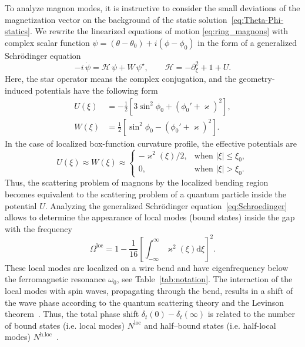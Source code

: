 To analyze magnon modes, it is instructive to consider the small deviations of the magnetization vector on the background of the static solution~\eqref{eq:Theta-Phi-statics}. We rewrite the linearized equations of motion \eqref{eq:ring_magnons} with complex scalar function $\psi=(\theta-\theta_0) + i \left(\phi-\phi_0\right)$  in the form of a generalized Schr\"odinger equation~\cite{Sheka04,Ivanov05b,Gaididei18a}
\begin{equation} \label{eq:Schroedinger}
-i \,\dot{\psi} = \mathcal{H} \, \psi + W \, \psi^\star, \qquad \mathcal{H} = -\partial_\xi^2 +1+U.
\end{equation}
Here, the star operator means the complex conjugation, and the geometry-induced potentials have the following form~\cite{Gaididei18a}
\begin{equation} \label{eq:V-n-W}
\begin{split}
U(\xi) &= -\frac{1}{2}\left[3\sin^2\phi_0  + \left(\phi_0 ' + \varkappa\right)^2\right],\\
W(\xi) &= \frac{1}{2}\left[\sin^2\phi_0  - \left(\phi_0 ' + \varkappa\right)^2\right].
\end{split}
\end{equation}
In the case of localized box-function curvature profile, the effective potentials are~\cite{Gaididei18a} 
\begin{equation} \label{eq:V-n-W-as}
U(\xi) \approx W(\xi) \approx
\begin{cases}
-\varkappa^2(\xi)/2, & \text{when $|\xi|\leq \xi_0$},\\
0, &\text{when $|\xi|> \xi_0$}.
\end{cases}
\end{equation}
Thus, the scattering problem of magnons by the localized bending region becomes equivalent to the scattering problem of a quantum particle inside the potential $U$. Analyzing the generalized Schr\"odinger equation~\eqref{eq:Schroedinger} allows to determine the appearance of local modes (bound states) inside the gap with the frequency~\cite{Gaididei18a} 
\begin{equation} \label{eq:omega-loc}
\Omega^{\text{loc}} = 1 - \frac{1}{16} \left[
\int_{-\infty}^{\infty} \varkappa^2(\xi)\mathrm{d}\xi\right]^2.
\end{equation}
These local modes are localized on a wire bend and have eigenfrequency below the ferromagnetic resonance $\omega_0$, see Table~\ref{tab:notation}. The interaction of the local modes with spin waves, propagating through the bend, results in a shift of the wave phase according to the quantum scattering theory and the Levinson theorem~\cite{Swan63}. Thus, the total phase shift $\delta_t(0)-\delta_t(\infty)$ is related to the number of bound states (i.e. local modes) $N^{\text{loc}}$ and half--bound states (i.e. half-local modes) $N^{\text{h.loc}}$~\cite{Ma06a}. 
